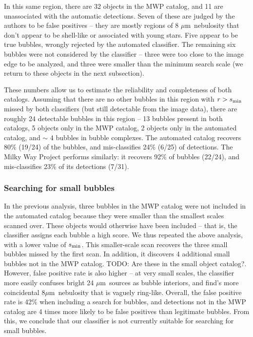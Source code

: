 \documentclass[preprint]{aastex}
\newcommand{\todo}[1]{{\color[rgb]{0, .5, .5} TODO: #1}}
\newcommand{\um}[0]{$\mu$m}
\begin{document}
In this same region, there are 32 objects in the MWP catalog, and 11 are unassociated with the automatic detections. Seven of these are judged by the authors to be false positives -- they are mostly regions of 8 \um\, nebulosity that don't appear to be shell-like or associated with young stars.  Five appear to be true bubbles, wrongly rejected by the automated classifier. The remaining six bubbles were not considered by the classifier -- three were too close to the image edge to be analyzed, and three were smaller than the minimum search scale (we return to these objects in the next subsection). 

These numbers allow us to estimate the reliability and completeness of both catalogs. Assuming that there are no other bubbles in this region with $r > s_{\rm min}$ missed by both classifiers (but still detectable from the image data), there are roughly 24 detectable bubbles in this region -- 13 bubbles present in both catalogs, 5 objects only in the MWP catalog, 2 objects only in the automated catalog, and $\sim$ 4 bubbles in bubble complexes. The automated catalog recovers 80\% (19/24) of the bubbles, and mis-classifies 24\% (6/25) of detections. The Milky Way Project performs similarly: it recovers 92\% of bubbles (22/24), and mis-classifies 23\% of its detections (7/31).

\subsubsection{Searching for small bubbles}
In the previous analysis, three bubbles in the MWP catalog were not included in the automated catalog because they were smaller than the smallest scales scanned over.  These objects would otherwise have been included -- that is, the classifier assigns each bubble a high score. We thus repeated the above analysis, with a lower value of $s_{\rm min}$. This smaller-scale scan recovers the three small bubbles missed by the first scan. In addition, it discovers 4 additional small bubbles not in the MWP catalog. \todo{Are these in the small object catalog?}. However, false positive rate is also higher -- at very small scales, the classifier more easily confuses bright 24 \um\, sources as bubble interiors, and find's more coincidental 8\um\, nebulosity that is vaguely ring-like. Overall, the false positive rate is 42\% when including a search for bubbles, and detections not in the MWP catalog are 4 times more likely to be false positives than legitimate bubbles. From this, we conclude that our classifier is not currently suitable for searching for small bubbles.
\end{document}

